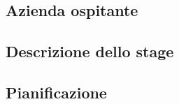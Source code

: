 \subsection{Azienda ospitante}


\subsection{Descrizione dello stage}


\subsection{Pianificazione}
